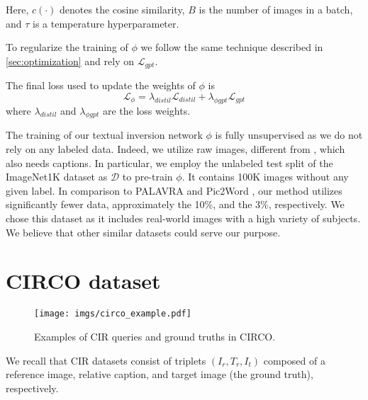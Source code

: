 \documentclass[10pt,twocolumn,letterpaper]{article}
\begin{document}
Here, $c(\cdot)$ denotes the cosine similarity, $B$ is the number of images in a batch, and $\tau$ is a temperature hyperparameter.

To regularize the training of $\phi$ we follow the same technique described in \cref{sec:optimization} and rely on $\mathcal{L}_{gpt}$.

The final loss used to update the weights of $\phi$ is
\begin{equation}\label{eq:loss_phi}    
    \mathcal{L}_{\phi} = \lambda_{distil} \mathcal{L}_{distil} +  \lambda_{\phi gpt} \mathcal{L}_{gpt}
\end{equation}
where $\lambda_{distil}$ and $\lambda_{\phi gpt}$ are the loss weights.

The training of our textual inversion network $\phi$ is fully unsupervised as we do not rely on any labeled data. Indeed, we utilize raw images, different from \cite{cohen2022this}, which also needs captions. In particular, we employ the unlabeled test split of the ImageNet1K \cite{russakovsky2015imagenet} dataset as $\mathcal{D}$ to pre-train $\phi$. It contains 100K images without any given label. In comparison to PALAVRA \cite{cohen2022this} and Pic2Word \cite{saito2023pic2word}, our method utilizes significantly fewer data, approximately the 10\%, and the 3\%, respectively. We chose this dataset as it includes real-world images with a high variety of subjects. We believe that other similar datasets could serve our purpose.



\section{CIRCO dataset} \label{sec:circo_dataset}

\begin{figure}
    \centering
    \texttt{[image: imgs/circo\_example.pdf]}
    \vspace{-3.5ex}
    \caption{Examples of CIR queries and ground truths in CIRCO.}
    \vspace{-4pt}
    \label{fig:circo_example}
\end{figure}

We recall that CIR datasets consist of triplets $(I_r, T_r, I_t)$ composed of a reference image, relative caption, and target image (\ie the ground truth), respectively. 
\end{document}
